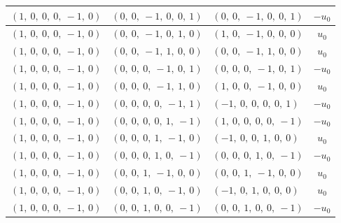 \documentclass[11pt]{article}
\theoremstyle{definition}
\begin{document}
\begin{longtable}{|l|l|l|c|}
    \hline
    $\left( 1, \  0, \  0, \  0, \  -1, \  0\right)$ & $\left( 0, \  0, \  -1, \  0, \  0, \  1\right)$ & $\left( 0, \  0, \  -1, \  0, \  0, \  1\right)$ & $- u_{0}$ \\
    \hline
    $\left( 1, \  0, \  0, \  0, \  -1, \  0\right)$ & $\left( 0, \  0, \  -1, \  0, \  1, \  0\right)$ & $\left( 1, \  0, \  -1, \  0, \  0, \  0\right)$ & $u_{0}$ \\
    \hline
    $\left( 1, \  0, \  0, \  0, \  -1, \  0\right)$ & $\left( 0, \  0, \  -1, \  1, \  0, \  0\right)$ & $\left( 0, \  0, \  -1, \  1, \  0, \  0\right)$ & $u_{0}$ \\
    \hline
    $\left( 1, \  0, \  0, \  0, \  -1, \  0\right)$ & $\left( 0, \  0, \  0, \  -1, \  0, \  1\right)$ & $\left( 0, \  0, \  0, \  -1, \  0, \  1\right)$ & $- u_{0}$ \\
    \hline
    $\left( 1, \  0, \  0, \  0, \  -1, \  0\right)$ & $\left( 0, \  0, \  0, \  -1, \  1, \  0\right)$ & $\left( 1, \  0, \  0, \  -1, \  0, \  0\right)$ & $u_{0}$ \\
    \hline
    $\left( 1, \  0, \  0, \  0, \  -1, \  0\right)$ & $\left( 0, \  0, \  0, \  0, \  -1, \  1\right)$ & $\left( -1, \  0, \  0, \  0, \  0, \  1\right)$ & $- u_{0}$ \\
    \hline
    $\left( 1, \  0, \  0, \  0, \  -1, \  0\right)$ & $\left( 0, \  0, \  0, \  0, \  1, \  -1\right)$ & $\left( 1, \  0, \  0, \  0, \  0, \  -1\right)$ & $- u_{0}$ \\
    \hline
    $\left( 1, \  0, \  0, \  0, \  -1, \  0\right)$ & $\left( 0, \  0, \  0, \  1, \  -1, \  0\right)$ & $\left( -1, \  0, \  0, \  1, \  0, \  0\right)$ & $u_{0}$ \\
    \hline
    $\left( 1, \  0, \  0, \  0, \  -1, \  0\right)$ & $\left( 0, \  0, \  0, \  1, \  0, \  -1\right)$ & $\left( 0, \  0, \  0, \  1, \  0, \  -1\right)$ & $- u_{0}$ \\
    \hline
    $\left( 1, \  0, \  0, \  0, \  -1, \  0\right)$ & $\left( 0, \  0, \  1, \  -1, \  0, \  0\right)$ & $\left( 0, \  0, \  1, \  -1, \  0, \  0\right)$ & $u_{0}$ \\
    \hline
    $\left( 1, \  0, \  0, \  0, \  -1, \  0\right)$ & $\left( 0, \  0, \  1, \  0, \  -1, \  0\right)$ & $\left( -1, \  0, \  1, \  0, \  0, \  0\right)$ & $u_{0}$ \\
    \hline
    $\left( 1, \  0, \  0, \  0, \  -1, \  0\right)$ & $\left( 0, \  0, \  1, \  0, \  0, \  -1\right)$ & $\left( 0, \  0, \  1, \  0, \  0, \  -1\right)$ & $- u_{0}$ \\

\end{longtable}
\end{document}
